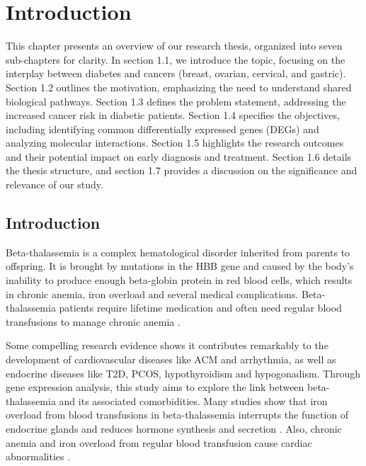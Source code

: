 %
%
\let\textcircled=\pgftextcircled
\chapter{Introduction}
\label{chap:intro}

This chapter presents an overview of our research thesis, organized into seven sub-chapters for clarity. In section 1.1, we introduce the topic, focusing on the interplay between diabetes and cancers (breast, ovarian, cervical, and gastric). Section 1.2 outlines the motivation, emphasizing the need to understand shared biological pathways. Section 1.3 defines the problem statement, addressing the increased cancer risk in diabetic patients. Section 1.4 specifies the objectives, including identifying common differentially expressed genes (DEGs) and analyzing molecular interactions. Section 1.5 highlights the research outcomes and their potential impact on early diagnosis and treatment. Section 1.6 details the thesis structure, and section 1.7 provides a discussion on the significance and relevance of our study.

\vspace{150mm}

\vspace{20mm}

\section{Introduction}
\label{sec:sec1_1}
Beta-thalassemia is a complex hematological disorder inherited from parents to offspring. It is brought by mutations in the HBB gene and caused by the body’s inability to produce enough beta-globin protein in red blood cells, which results in chronic anemia, iron overload and several medical complications. Beta-thalassemia patients require lifetime medication and often need regular blood transfusions to manage chronic anemia \cite{b1}.

Some compelling research evidence shows it contributes remarkably to the development of cardiovascular diseases like ACM and arrhythmia, as well as endocrine diseases like T2D, PCOS, hypothyroidism and hypogonadism. Through gene expression analysis, this study aims to explore the link between beta-thalassemia and its associated comorbidities. Many studies show that iron overload from blood transfusions in beta-thalassemia interrupts the function of endocrine glands and reduces hormone synthesis and secretion \cite{b1}. Also, chronic anemia and iron overload from regular blood transfusion cause cardiac abnormalities \cite{b2}.

